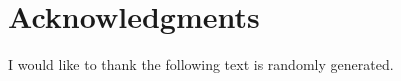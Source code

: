 \newpage
\chapter*{Acknowledgments}
 I would like to thank the following text is randomly generated. \lipsum[3]
